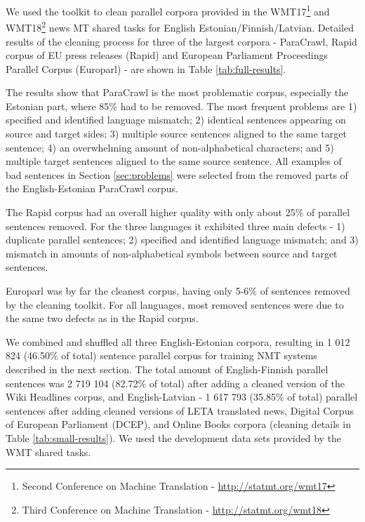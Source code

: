 \documentclass{IOS-Book-Article}
\begin{document}
We used the toolkit to clean parallel corpora provided in the WMT17\footnote{Second Conference on Machine Translation - \url{http://statmt.org/wmt17}} and WMT18\footnote{Third Conference on Machine Translation - \url{http://statmt.org/wmt18}} news MT shared tasks for English  Estonian/Finnish/Latvian. Detailed results of the cleaning process for three of the largest corpora - ParaCrawl, Rapid corpus of EU press releases (Rapid) and European Parliament Proceedings Parallel Corpus (Europarl) - are shown in Table \ref{tab:full-results}.

The results show that ParaCrawl is the most problematic corpus, especially the Estonian part, where 85\% had to be removed. The most frequent problems are 1) specified and identified language mismatch; 2) identical sentences appearing on source and target sides; 3) multiple source sentences aligned to the same target sentence; 4) an overwhelming amount of non-alphabetical characters; and 5) multiple target sentences aligned to the same source sentence. All examples of bad sentences in Section \ref{sec:problems} were selected from the removed parts of the English-Estonian ParaCrawl corpus.

The Rapid corpus had an overall higher quality with only about 25\% of parallel sentences removed. For the three languages it exhibited three main defects - 1) duplicate parallel sentences; 2) specified and identified language mismatch; and 3) mismatch in amounts of non-alphabetical symbols between source and target sentences.

Europarl was by far the cleanest corpus, having only 5-6\% of sentences removed by the cleaning toolkit. For all languages, most removed sentences were due to the same two defects as in the Rapid corpus.

We combined and shuffled all three English-Estonian corpora, resulting in 1 012 824 (46.50\% of total) sentence parallel corpus for training NMT systems described in the next section. The total amount of English-Finnish parallel sentences was 2 719 104 (82.72\% of total) after adding a cleaned version of the Wiki Headlines corpus, and English-Latvian - 1 617 793 (35.85\% of total) parallel sentences after adding cleaned versions of LETA translated news, Digital Corpus of European Parliament (DCEP), and Online Books corpora (cleaning details in Table \ref{tab:small-results}). We used the development data sets provided by the WMT shared tasks.
\end{document}
